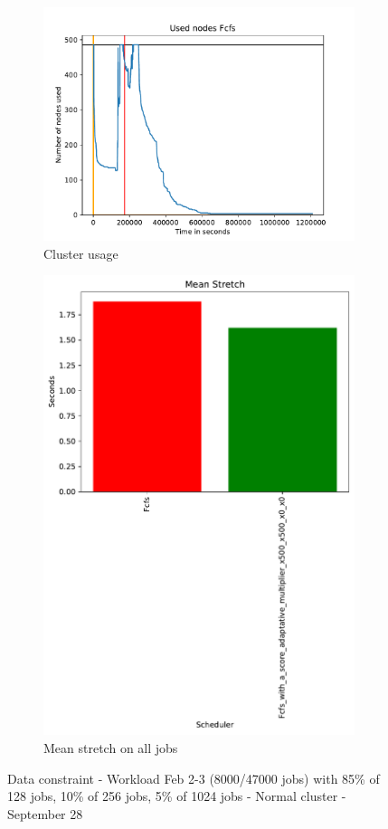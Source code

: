 \documentclass[a4paper]{article}
\begin{document}
\begin{figure}[H]\centering
\begin{subfigure}[b]{0.4\linewidth}\centering\includegraphics[width=0.9\linewidth]{MBSS/plot/2022-02-02->2022-02-03_V85105_Fcfs_Used_nodes_450_128_32_256_4_1024.pdf}\caption{Cluster usage}\end{subfigure}
\begin{subfigure}[b]{0.4\linewidth}\centering\includegraphics[width=0.9\linewidth]{MBSS/plot/Results_FCFS_Score_Adaptative_Multiplier_2022-02-02->2022-02-03_V85105_Mean_Stretch_450_128_32_256_4_1024.pdf}\caption{Mean stretch on all jobs}\end{subfigure}
\caption{Data constraint - Workload Feb 2-3 (8000/47000 jobs) with 85\% of 128 jobs, 10\% of 256 jobs, 5\% of 1024 jobs - Normal cluster - September 28}\end{figure}
\end{document}
